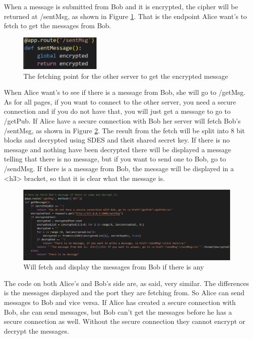 \documentclass[12pt, letterpaper]{article}
\begin{document}
When a message is submitted from Bob and it is encrypted, the cipher will be returned at /sentMsg, as shown in Figure \ref{fig:sentMsg}. That is the endpoint Alice want's to fetch to get the messages from Bob.

\begin{figure}[H]
  \includegraphics[width=150px]{code_snippets/sentMsg.PNG}\centering
  \caption{The fetching point for the other server to get the encrypted message}
  \label{fig:sentMsg}
\end{figure}

When Alice want's to see if there is a message from Bob, she will go to /getMsg. As for all pages, if you want to connect to the other server, you need a secure connection and if you do not have that, you will just get a message to go to /getPub. If Alice have a secure connection with Bob her server will fetch Bob's /sentMsg, as shown in Figure \ref{fig:getMsg}. The result from the fetch will be split into 8 bit blocks and decrypted using SDES and theit shared secret key. If there is no message and nothing have been decrypted there will be displayed a message telling that there is no message, but if you want to send one to Bob, go to /sendMsg. If there is a message from Bob, the message will be displayed in a <h3> bracket, so that it is clear what the message is. 

\begin{figure}[H]
  \hspace*{-50px}\includegraphics[width=500px]{code_snippets/getMsg.PNG}
  \caption{Will fetch and display the messages from Bob if there is any}
  \label{fig:getMsg}
\end{figure}

The code on both Alice's and Bob's side are, as said, very similar. The differences is the messages displayed and the port they are fetching from. So Alice can send messages to Bob and vice versa. If Alice has created a secure connection with Bob, she can send messages, but Bob can't get the messages before he has a secure connection as well. Without the secure connection they cannot encrypt or decrypt the messages. 
\end{document}
